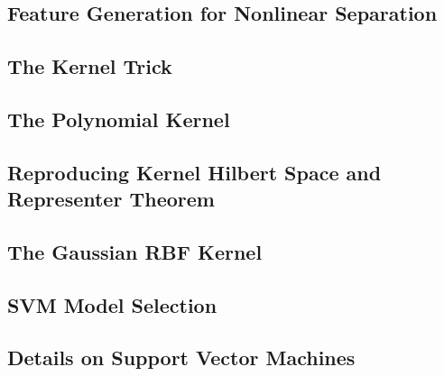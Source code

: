 

\subsection{Feature Generation for Nonlinear Separation}


\subsection{The Kernel Trick}


\subsection{The Polynomial Kernel}


\subsection{Reproducing Kernel Hilbert Space and Representer Theorem}


\subsection{The Gaussian RBF Kernel}


\subsection{SVM Model Selection}


\subsection{Details on Support Vector Machines}




